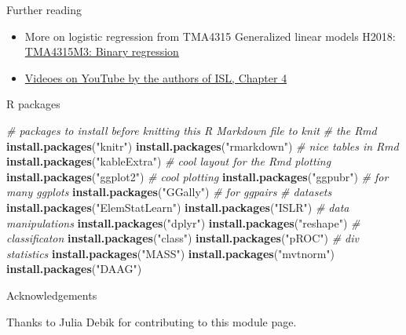 \documentclass[10pt,ignorenonframetext,]{beamer}
\newenvironment{Shaded}{\begin{snugshade}}{\end{snugshade}}
\newcommand{\KeywordTok}[1]{\textcolor[rgb]{0.13,0.29,0.53}{\textbf{#1}}}
\newcommand{\StringTok}[1]{\textcolor[rgb]{0.31,0.60,0.02}{#1}}
\newcommand{\CommentTok}[1]{\textcolor[rgb]{0.56,0.35,0.01}{\textit{#1}}}
\newcommand{\NormalTok}[1]{#1}
\providecommand{\tightlist}{%
  \setlength{\itemsep}{0pt}\setlength{\parskip}{0pt}}
\begin{document}
\begin{frame}{ Further reading }

\begin{itemize}
\tightlist
\item
  More on logistic regression from TMA4315 Generalized linear models
  H2018:
  \href{https://www.math.ntnu.no/emner/TMA4315/2018h/3BinReg.html}{TMA4315M3:
  Binary regression}
\item
  \href{https://www.youtube.com/playlist?list=PL5-da3qGB5IC4vaDba5ClatUmFppXLAhE}{Videoes
  on YouTube by the authors of ISL, Chapter 4}
\end{itemize}

\end{frame}

\begin{frame}[fragile]{ R packages}

\begin{Shaded}
\begin{Highlighting}[]
\CommentTok{# packages to install before knitting this R Markdown file to knit}
\CommentTok{# the Rmd}
\KeywordTok{install.packages}\NormalTok{(}\StringTok{"knitr"}\NormalTok{)}
\KeywordTok{install.packages}\NormalTok{(}\StringTok{"rmarkdown"}\NormalTok{)}
\CommentTok{# nice tables in Rmd}
\KeywordTok{install.packages}\NormalTok{(}\StringTok{"kableExtra"}\NormalTok{)}
\CommentTok{# cool layout for the Rmd plotting}
\KeywordTok{install.packages}\NormalTok{(}\StringTok{"ggplot2"}\NormalTok{)  }\CommentTok{# cool plotting}
\KeywordTok{install.packages}\NormalTok{(}\StringTok{"ggpubr"}\NormalTok{)  }\CommentTok{# for many ggplots}
\KeywordTok{install.packages}\NormalTok{(}\StringTok{"GGally"}\NormalTok{)  }\CommentTok{# for ggpairs}
\CommentTok{# datasets}
\KeywordTok{install.packages}\NormalTok{(}\StringTok{"ElemStatLearn"}\NormalTok{)}
\KeywordTok{install.packages}\NormalTok{(}\StringTok{"ISLR"}\NormalTok{)}
\CommentTok{# data manipulations}
\KeywordTok{install.packages}\NormalTok{(}\StringTok{"dplyr"}\NormalTok{)}
\KeywordTok{install.packages}\NormalTok{(}\StringTok{"reshape"}\NormalTok{)}
\CommentTok{# classificaton}
\KeywordTok{install.packages}\NormalTok{(}\StringTok{"class"}\NormalTok{)}
\KeywordTok{install.packages}\NormalTok{(}\StringTok{"pROC"}\NormalTok{)}
\CommentTok{# div statistics}
\KeywordTok{install.packages}\NormalTok{(}\StringTok{"MASS"}\NormalTok{)}
\KeywordTok{install.packages}\NormalTok{(}\StringTok{"mvtnorm"}\NormalTok{)}
\KeywordTok{install.packages}\NormalTok{(}\StringTok{"DAAG"}\NormalTok{)}
\end{Highlighting}
\end{Shaded}

\end{frame}

\begin{frame}{Acknowledgements}

Thanks to Julia Debik for contributing to this module page.

\end{frame}
\end{document}
